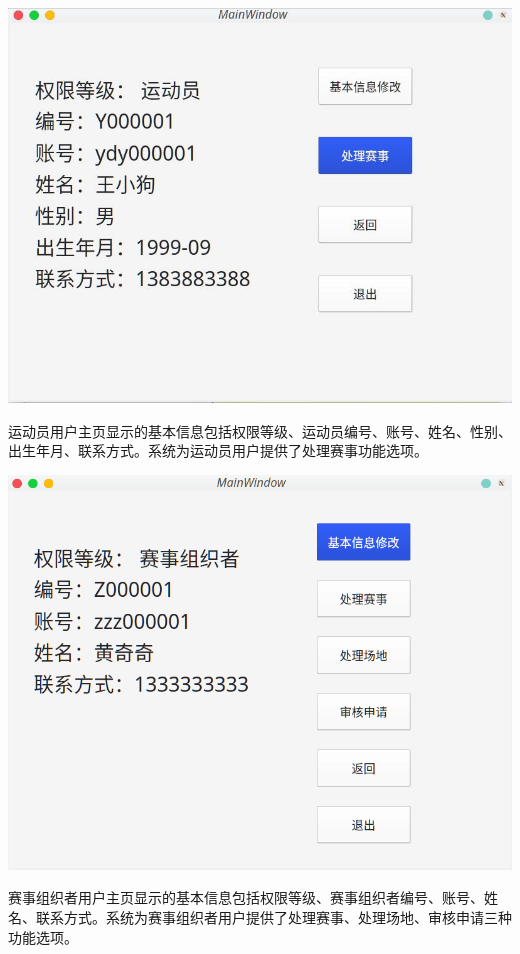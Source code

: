 \documentclass[a4paper,UTF8]{article}
\begin{document}
{\centering\includegraphics[width=1\columnwidth]{6.png}
	
}

运动员用户主页显示的基本信息包括权限等级、运动员编号、账号、姓名、性别、出生年月、联系方式。系统为运动员用户提供了处理赛事功能选项。

{\centering\includegraphics[width=1\columnwidth]{8.png}
	
}

赛事组织者用户主页显示的基本信息包括权限等级、赛事组织者编号、账号、姓名、联系方式。系统为赛事组织者用户提供了处理赛事、处理场地、审核申请三种功能选项。
\end{document}

